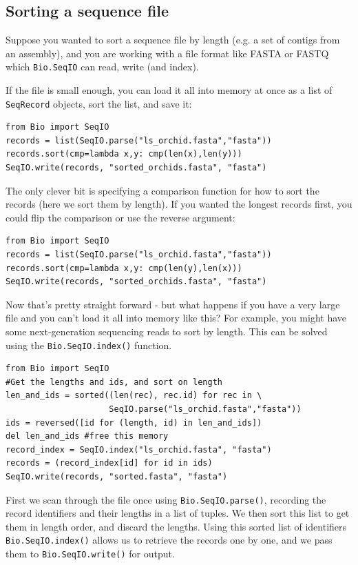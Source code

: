 \documentclass{report}
\begin{document}
\subsection{Sorting a sequence file}
\label{sec:SeqIO-sort}

Suppose you wanted to sort a sequence file by length (e.g. a set of
contigs from an assembly), and you are working with a file format like
FASTA or FASTQ which \verb|Bio.SeqIO| can read, write (and index).

If the file is small enough, you can load it all into memory at once
as a list of \verb|SeqRecord| objects, sort the list, and save it:

\begin{verbatim}
from Bio import SeqIO
records = list(SeqIO.parse("ls_orchid.fasta","fasta"))
records.sort(cmp=lambda x,y: cmp(len(x),len(y)))
SeqIO.write(records, "sorted_orchids.fasta", "fasta")
\end{verbatim}

The only clever bit is specifying a comparison function for how to
sort the records (here we sort them by length). If you wanted the
longest records first, you could flip the comparison or use the
reverse argument:

\begin{verbatim}
from Bio import SeqIO
records = list(SeqIO.parse("ls_orchid.fasta","fasta"))
records.sort(cmp=lambda x,y: cmp(len(y),len(x)))
SeqIO.write(records, "sorted_orchids.fasta", "fasta")
\end{verbatim}

Now that's pretty straight forward - but what happens if you have a
very large file and you can't load it all into memory like this?
For example, you might have some next-generation sequencing reads
to sort by length. This can be solved using the
\verb|Bio.SeqIO.index()| function.

\begin{verbatim}
from Bio import SeqIO
#Get the lengths and ids, and sort on length         
len_and_ids = sorted((len(rec), rec.id) for rec in \
                     SeqIO.parse("ls_orchid.fasta","fasta"))
ids = reversed([id for (length, id) in len_and_ids])
del len_and_ids	#free this memory
record_index = SeqIO.index("ls_orchid.fasta", "fasta")
records = (record_index[id] for id in ids)
SeqIO.write(records, "sorted.fasta", "fasta")
\end{verbatim}

First we scan through the file once using \verb|Bio.SeqIO.parse()|,
recording the record identifiers and their lengths in a list of tuples.
We then sort this list to get them in length order, and discard the lengths.
Using this sorted list of identifiers \verb|Bio.SeqIO.index()| allows us to
retrieve the records one by one, and we pass them to \verb|Bio.SeqIO.write()|
for output.
\end{document}
